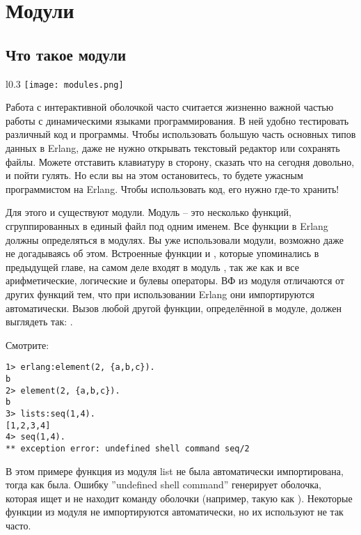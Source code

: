\chapter{Модули}
\label{modules}
\section{Что такое модули}
\label{what-are-modules}
\begin{wrapfigure}{l}{0.3\linewidth}
    \texttt{[image: modules.png]}
\end{wrapfigure}

Работа с интерактивной оболочкой часто считается жизненно важной частью работы с динамическими языками программирования.
В ней удобно тестировать различный код и программы.
Чтобы использовать большую часть основных типов данных в Erlang, даже не нужно открывать текстовый редактор или сохранять файлы.
Можете отставить клавиатуру в сторону, сказать что на сегодня довольно, и пойти гулять.
Но если вы на этом остановитесь, то будете ужасным программистом на Erlang.
Чтобы использовать код, его нужно где\--то хранить!

Для этого и существуют модули.
Модуль \--- это несколько функций, сгруппированных в единый файл под одним именем.
Все функции в Erlang должны определяться в модулях.
Вы уже использовали модули, возможно даже не догадываясь об этом.
Встроенные функции  и , которые упоминались в предыдущей главе, на самом деле входят в модуль , так же как и все арифметические, логические и булевы операторы.
ВФ из модуля  отличаются от других функций тем, что при использовании Erlang они импортируются автоматически.
Вызов любой другой функции, определённой в модуле, должен выглядеть так: .

Смотрите:
\begin{lstlisting}[style=repl]
1> erlang:element(2, {a,b,c}).
b
2> element(2, {a,b,c}).
b
3> lists:seq(1,4).
[1,2,3,4]
4> seq(1,4).
** exception error: undefined shell command seq/2
\end{lstlisting}

В этом примере функция  из модуля list не была автоматически импортирована, тогда как  была.
Ошибку ''undefined shell command'' генерирует оболочка, которая ищет и не находит команду оболочки (например, такую как ).
Некоторые функции из модуля  не импортируются автоматически, но их используют не так часто.


